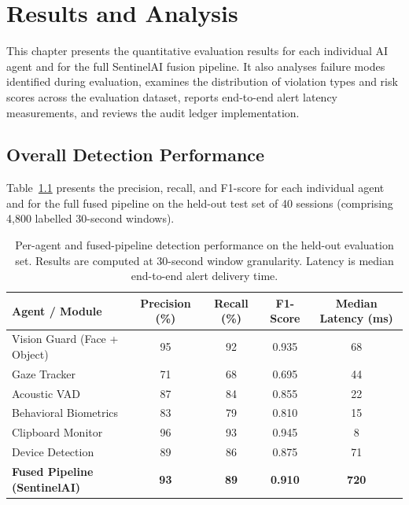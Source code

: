 \renewcommand{\baselinestretch}{1.5}\normalsize
\chapter{Results and Analysis}

This chapter presents the quantitative evaluation results for each individual AI agent and for the full SentinelAI fusion pipeline. It also analyses failure modes identified during evaluation, examines the distribution of violation types and risk scores across the evaluation dataset, reports end-to-end alert latency measurements, and reviews the audit ledger implementation.

\section{Overall Detection Performance}

Table~\ref{tab:headline} presents the precision, recall, and F1-score for each individual agent and for the full fused pipeline on the held-out test set of 40 sessions (comprising 4,800 labelled 30-second windows).

\begin{table}[h]
    \centering
    \caption{Per-agent and fused-pipeline detection performance on the held-out evaluation set. Results are computed at 30-second window granularity. Latency is median end-to-end alert delivery time.}
    \begin{tabular}{@{}lcccc@{}}
        \toprule
        Agent / Module                & Precision (\%) & Recall (\%) & F1-Score & Median Latency (ms) \\
        \midrule
        Vision Guard (Face + Object)  & 95             & 92          & 0.935    & 68                  \\
        Gaze Tracker                  & 71             & 68          & 0.695    & 44                  \\
        Acoustic VAD                  & 87             & 84          & 0.855    & 22                  \\
        Behavioral Biometrics         & 83             & 79          & 0.810    & 15                  \\
        Clipboard Monitor             & 96             & 93          & 0.945    & 8                   \\
        Device Detection              & 89             & 86          & 0.875    & 71                  \\
        \midrule
        \textbf{Fused Pipeline (SentinelAI)} & \textbf{93} & \textbf{89} & \textbf{0.910} & \textbf{720} \\
        \bottomrule
    \end{tabular}
    \label{tab:headline}
\end{table}

